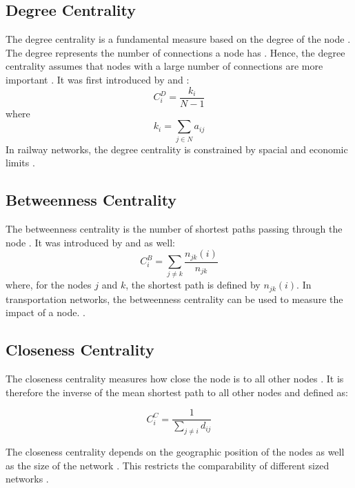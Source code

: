 \documentclass{Resources/netsci-project}
\begin{document}
\subsection{Degree Centrality}
The degree centrality is a fundamental measure based on the degree of the node \autocite{ComplexTopology}. The degree represents the number of connections a node has \autocite{ComplexTopology}. Hence, the degree centrality assumes that nodes with a large number of connections are more important \autocite{ComplexTopology}. It was first introduced by \textcite{Freeman} and \textcite{Freeman2}:
\begin{equation} \label{eqRestMass}
C_{i}^{D} = \dfrac{k_i}{N-1}
\end{equation}
where 
\begin{equation} \label{eqRestMass}
k_{i} = \sum_{j \in N}a_{ij}
\end{equation}
In railway networks, the degree centrality is constrained by spacial and economic limits \autocite{GraphSwiss}.

\subsection{Betweenness Centrality}
The betweenness centrality is the number of shortest paths passing through the node \autocite{ComplexTopology}. It was introduced  by \textcite{Freeman} and \textcite{Freeman2} as well:
\begin{equation} \label{eqRestMass}
C_{i}^{B} = \sum_{j \neq k} \dfrac{n_{jk}(i)}{n_{jk}}
\end{equation}
where, for the nodes $ j $ and $ k $, the shortest path is defined by $n_{jk}(i) $. In transportation networks, the betweenness centrality can be used to measure the impact of a node. \autocite{ComplexTopology}.

\subsection{Closeness Centrality}
The closeness centrality measures how close the node is to all other nodes \autocite{ComplexTopology}. It is therefore the inverse of the mean shortest path to all other nodes and defined as: \autocite{ComplexTopology}

\begin{equation} \label{eqRestMass}
    C_{i}^{C} =\dfrac{1}{\sum_{j \neq i} d_{ij}}
\end{equation}

The closeness centrality depends on the geographic position of the nodes as well as the size of the network \autocite{GraphSwiss}. This restricts the comparability of different sized networks \autocite{GraphSwiss}.
\end{document}
